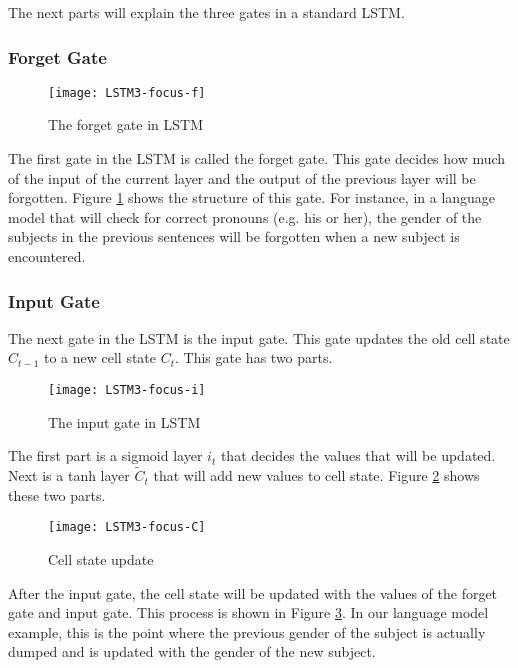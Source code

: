         The next parts will explain the three gates in a standard LSTM.

    \subsubsection{Forget Gate}
        \begin{figure}[H]
        \centering
        \texttt{[image: LSTM3-focus-f]}
        \caption{The forget gate in LSTM \cite{olah2015understanding}}
        \label{fig:lstm-forget-gate}
        \end{figure}
        The first gate in the LSTM is called the forget gate. This gate decides how much of the input of the current layer and the output of the previous layer will be forgotten. Figure \ref{fig:lstm-forget-gate} shows the structure of this gate. For instance, in a language model that will check for correct pronouns (e.g. his or her), the gender of the subjects in the previous sentences will be forgotten when a new subject is encountered.

    \subsubsection{Input Gate}
        The next gate in the LSTM is the input gate. This gate updates the old cell state \( C_{t-1} \) to a new cell state \( C_t \). This gate has two parts.

        \begin{figure}[H]
        \centering
        \texttt{[image: LSTM3-focus-i]}
        \caption{The input gate in LSTM \cite{olah2015understanding}}
        \label{fig:lstm-input-gate}
        \end{figure}

        The first part is a sigmoid layer \( i_t \) that decides the values that will be updated. Next is a tanh layer \(\tilde{C}_t\) that will add new values to cell state. Figure \ref{fig:lstm-input-gate} shows these two parts.

        \begin{figure}[H]
        \centering
        \texttt{[image: LSTM3-focus-C]}
        \caption{Cell state update \cite{olah2015understanding}}
        \label{fig:lstm-cell-state-update}
        \end{figure}
        After the input gate, the cell state will be updated with the values of the forget gate and input gate. This process is shown in Figure \ref{fig:lstm-cell-state-update}. In our language model example, this is the point where the previous gender of the subject is actually dumped and is updated with the gender of the new subject.

